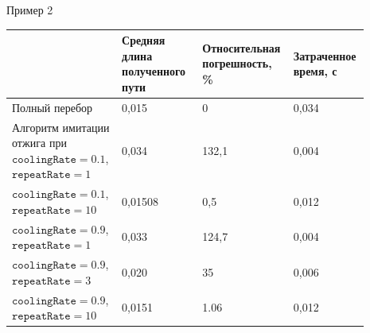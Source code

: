 \documentclass[ignoreonframetext,unicode]{beamer}
\begin{document}
\begin{frame}{Пример 2}
\begin{table}[h]
	\small{
	\begin{center}
		\begin{tabular}{|p{0.3\linewidth}|p{0.22\linewidth}|p{0.2\linewidth}|p{0.17\linewidth}|} \hline
			& Средняя длина полученного пути & Относительная погрешность, \% & Затраченное время, с\\ \hline
			Полный перебор                               & 0,015
			& 0   & 0,034 \\ \hline
			Алгоритм имитации отжига при $\texttt{coolingRate}=0.1$, $\texttt{repeatRate}=1$ & 0,034 & 132,1 & 0,004 \\ \hline
			 $\texttt{coolingRate}=0.1$, $\texttt{repeatRate}=10$ & 0,01508 & 0,5 & 0,012 \\ \hline
			 $\texttt{coolingRate}=0.9$, $\texttt{repeatRate}=1$ & 0,033 & 124,7  & 0,004 \\ \hline
			 $\texttt{coolingRate}=0.9$, $\texttt{repeatRate}=3$ & 0,020 & 35 & 0,006 \\ \hline
			 $\texttt{coolingRate}=0.9$, $\texttt{repeatRate}=10$ & 0,0151 & 1.06 & 0,012 \\ \hline
		\end{tabular}
	\end{center}
}
\end{table}

\end{frame}
\end{document}
